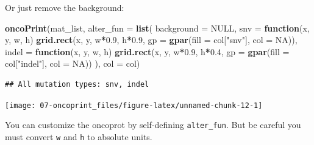 \documentclass[]{book}
\newenvironment{Shaded}{\begin{snugshade}}{\end{snugshade}}
\newcommand{\KeywordTok}[1]{\textcolor[rgb]{0.13,0.29,0.53}{\textbf{#1}}}
\newcommand{\DataTypeTok}[1]{\textcolor[rgb]{0.13,0.29,0.53}{#1}}
\newcommand{\FloatTok}[1]{\textcolor[rgb]{0.00,0.00,0.81}{#1}}
\newcommand{\StringTok}[1]{\textcolor[rgb]{0.31,0.60,0.02}{#1}}
\newcommand{\OtherTok}[1]{\textcolor[rgb]{0.56,0.35,0.01}{#1}}
\newcommand{\ControlFlowTok}[1]{\textcolor[rgb]{0.13,0.29,0.53}{\textbf{#1}}}
\newcommand{\OperatorTok}[1]{\textcolor[rgb]{0.81,0.36,0.00}{\textbf{#1}}}
\newcommand{\NormalTok}[1]{#1}
\theoremstyle{definition}
\theoremstyle{definition}
\theoremstyle{definition}
\theoremstyle{remark}
\begin{document}
Or just remove the background:

\begin{Shaded}
\begin{Highlighting}[]
\KeywordTok{oncoPrint}\NormalTok{(mat_list,}
    \DataTypeTok{alter_fun =} \KeywordTok{list}\NormalTok{(}
        \DataTypeTok{background =} \OtherTok{NULL}\NormalTok{,}
        \DataTypeTok{snv =} \ControlFlowTok{function}\NormalTok{(x, y, w, h) }\KeywordTok{grid.rect}\NormalTok{(x, y, w}\OperatorTok{*}\FloatTok{0.9}\NormalTok{, h}\OperatorTok{*}\FloatTok{0.9}\NormalTok{, }\DataTypeTok{gp =} \KeywordTok{gpar}\NormalTok{(}\DataTypeTok{fill =}\NormalTok{ col[}\StringTok{"snv"}\NormalTok{], }\DataTypeTok{col =} \OtherTok{NA}\NormalTok{)),}
        \DataTypeTok{indel =} \ControlFlowTok{function}\NormalTok{(x, y, w, h) }\KeywordTok{grid.rect}\NormalTok{(x, y, w}\OperatorTok{*}\FloatTok{0.9}\NormalTok{, h}\OperatorTok{*}\FloatTok{0.4}\NormalTok{, }\DataTypeTok{gp =} \KeywordTok{gpar}\NormalTok{(}\DataTypeTok{fill =}\NormalTok{ col[}\StringTok{"indel"}\NormalTok{], }\DataTypeTok{col =} \OtherTok{NA}\NormalTok{))}
\NormalTok{    ), }\DataTypeTok{col =}\NormalTok{ col)}
\end{Highlighting}
\end{Shaded}

\begin{verbatim}
## All mutation types: snv, indel
\end{verbatim}

\begin{center}\texttt{[image: 07-oncoprint\_files/figure-latex/unnamed-chunk-12-1]} \end{center}

You can customize the oncoprot by self-defining \texttt{alter\_fun}. But
be careful you must convert \texttt{w} and \texttt{h} to absolute units.
\end{document}
